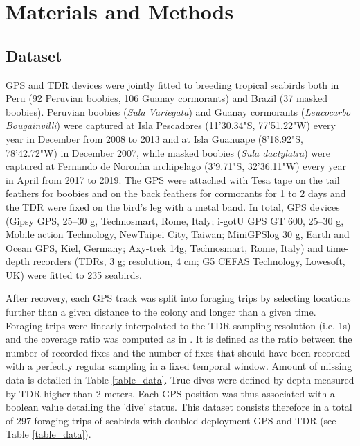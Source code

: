 \documentclass{article}
\begin{document}
\section{Materials and Methods}
\subsection{Dataset}

GPS and TDR devices were jointly fitted to breeding tropical seabirds both in Peru (92 Peruvian boobies, 106 Guanay cormorants) and Brazil (37 masked boobies). Peruvian boobies (\textit{Sula Variegata}) and Guanay cormorants (\textit{Leucocarbo Bougainvilli}) were captured at Isla Pescadores (11'30.34"S, 77'51.22"W) every year in December from 2008 to 2013 and at Isla Guanuape (8'18.92"S, 78'42.72"W) in December 2007, while masked boobies (\textit{Sula dactylatra}) were captured at Fernando de Noronha archipelago (3'9.71"S, 32'36.11"W) every year in April from 2017 to 2019. The GPS were attached with Tesa tape on the tail feathers for boobies and on the back feathers for cormorants for 1 to 2 days and the TDR were fixed on the bird's leg with a metal band. In total, GPS devices (Gipsy GPS, 25–30 g, Technosmart, Rome, Italy; i-gotU GPS GT 600, 25–30 g, Mobile action Technology, NewTaipei City, Taiwan; MiniGPSlog 30 g, Earth and Ocean GPS, Kiel, Germany; Axy-trek 14g, Technosmart, Rome, Italy) and time-depth recorders (TDRs, 3 g; resolution, 4 cm; G5 CEFAS Technology, Lowesoft, UK) were fitted to 235 seabirds.

After recovery, each GPS track was split into foraging trips by selecting locations further than a given distance to the colony and longer than a given time. Foraging trips were linearly interpolated to the TDR sampling resolution (i.e. 1s) and the coverage ratio was computed as in \cite{browning_predicting_2018}. It is defined as the ratio between the number of recorded fixes and the number of fixes that should have been recorded with a perfectly regular sampling in a fixed temporal window. Amount of missing data is detailed in Table \ref{table_data}. True dives were defined by depth measured by TDR higher than 2 meters. Each GPS position was thus associated with a boolean value detailing the 'dive' status. This dataset consists therefore in a total of 297 foraging trips of seabirds with doubled-deployment GPS and TDR (see Table \ref{table_data}).
\end{document}
